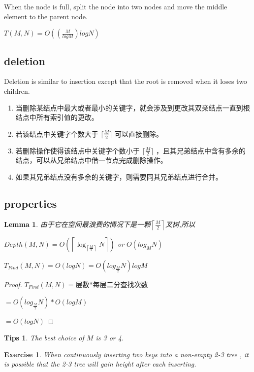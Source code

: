 \documentclass{article}
\newtheorem*{Lemma}{Lemma}
\newtheorem*{Tips}{Tips}
\newtheorem*{Exercise}{Exercise}
\begin{document}
When the node is full, split the node into two nodes and move the middle element to the parent node. \par
$T(M,N) = O((\frac{M}{logM})logN)$

\subsection{deletion}
Deletion is similar to insertion except that the root is removed when it loses two children.\par

\begin{enumerate}
    \item 当删除某结点中最大或者最小的关键字，就会涉及到更改其双亲结点一直到根结点中所有索引值的更改。
    \item 若该结点中关键字个数大于 $\lceil \frac{M}{2} \rceil$ 可以直接删除。
    \item 若删除操作使得该结点中关键字个数小于 $\lceil \frac{M}{2} \rceil$ ，且其兄弟结点中含有多余的结点，可以从兄弟结点中借一节点完成删除操作。
    \item 如果其兄弟结点没有多余的关键字，则需要同其兄弟结点进行合并。
\end{enumerate}

\subsection{properties}
\begin{Lemma}
    由于它在空间最浪费的情况下是一颗$\left \lceil \frac{M}{2} \right \rceil$叉树,所以\par
    $Depth(M,N) = O(\left \lceil \log_{\left \lceil \frac{M}{2} \right \rceil} N \right \rceil)$ or $O(log_M N)$\par
    $T_{Find}(M,N) = O(logN) = O(log_{\frac{M}{2}}N)log M$
\end{Lemma}

\begin{proof}
    $T_{Find}(M,N) =$层数$*$每层二分查找次数\par
    $=O(log_{\frac{M}{2}}N) * O(log M)$\par
    $ = O(log N)$
\end{proof}

\begin{Tips}
    The best choice of $M$ is 3 or 4.
\end{Tips}

\begin{Exercise}
    When continuously inserting two keys into a non-empty 2-3 tree , it is possible that the 2-3 tree will gain height after each inserting.
\end{Exercise}
\end{document}
